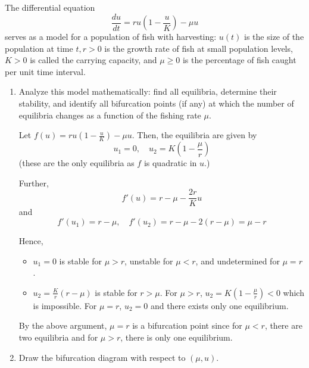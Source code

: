 \documentclass[12pt]{article}
\begin{document}
The differential equation
\[\frac{du}{dt} = ru\left(1 - \frac{u}{K}\right) - \mu u\]
serves as a model for a population of fish with harvesting: $u(t)$ is the size of the population at time $t, r > 0$ is the
growth rate of fish at small population levels, $K > 0$ is called the carrying capacity, and $\mu \geq 0$ is the percentage of
fish caught per unit time interval.
\begin{enumerate}
    \item Analyze this model mathematically: find all equilibria, determine their stability, and identify all bifurcation
          points (if any) at which the number of equilibria changes as a function of the fishing rate $\mu$.

          \color{blue}
          Let $f(u) = ru\left(1 - \frac{u}{K}\right) - \mu u$. Then, the equilibria are given by
          \[u_1 = 0, \quad u_2 = K(1 -\frac{\mu}{r})\]
          (these are the only equilibria as $f$ is quadratic in $u$.)

          Further,
          \[f'(u) = r - \mu - \frac{2r}{K}u\]
          and
          \[f'(u_1) = r - \mu, \quad f'(u_2) = r - \mu - 2(r - \mu) = \mu - r\]

          Hence,
          \begin{itemize}
              \item $u_1 = 0$ is stable for $\mu > r$, unstable for $\mu < r$, and undetermined for $\mu = r$.\
              \item $u_2 = \frac{K}{r}(r -\mu)$ is stable for $r > \mu$. For $\mu > r$, $u_2 = K(1 - \frac{\mu}{r}) < 0$ which is impossible. For $\mu = r$, $u_2 = 0$ and there exists only one equilibrium.
          \end{itemize}

          By the above argument, $\mu = r$ is a bifurcation point since for $\mu < r$, there are two equilibria and for $\mu > r$, there is only one equilibrium.

          \color{black}


    \item Draw the bifurcation diagram with respect to $(\mu, u).$

          \begin{center}
\end{center}
\end{enumerate}
\end{document}
